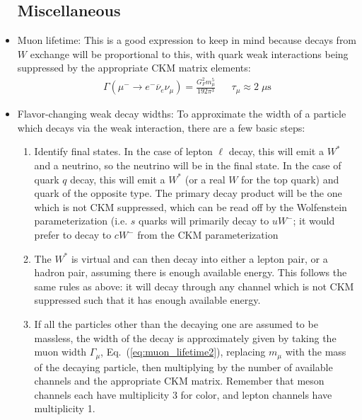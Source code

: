 \documentclass[11pt, oneside]{article}   	%
\theoremstyle{definition}
\numberwithin{equation}{subsection}		%
\begin{document}
\begin{itemize}
	\newpage
	\subsection{Miscellaneous}
	
	\item Muon lifetime: This is a good expression to keep in mind because decays from $W$ exchange will be proportional to this, 
	with quark weak interactions being suppressed by the appropriate CKM matrix elements:
	\begin{align}
		\Gamma(\mu^-\rightarrow e^- \overline\nu_e \nu_\mu) = \frac{G_F^2 m_\mu^5}{192\pi^3} && \tau_\mu\approx 2\;\mu\mathrm{s}
		\label{eq:muon_lifetime2}
	\end{align}
	
	\item Flavor-changing weak decay widths: To approximate the width of a particle which decays via the weak interaction, there are a few 
	basic steps:
	\begin{enumerate}
		\item Identify final states. In the case of lepton $\ell$ decay, this will emit a $W^*$ and a neutrino, so the neutrino will be 
		in the final state. In the case of quark $q$ decay, this will emit a $W^*$ (or a real $W$ for the top quark) and quark of the 
		opposite type. The primary decay product will be the one which is not CKM suppressed, which can be read off by the 
		Wolfenstein parameterization (i.e. $s$ quarks will primarily decay to $u W^-$; it would prefer to decay to $c W^-$ from the 
		CKM parameterization
		\item The $W^*$ is virtual and can then decay into either a lepton pair, or a hadron pair, assuming there is enough 
		available energy. This follows the same rules as above: it will decay through any channel which is not CKM suppressed 
		such that it has enough available energy.
		\item If all the particles other than the decaying one are assumed to be massless, the width of the decay is approximately 
		given by taking the muon width $\Gamma_\mu$, Eq.~(\ref{eq:muon_lifetime2}), replacing $m_\mu$ with the 
		mass of the decaying particle, then multiplying by the number of available channels and the appropriate CKM matrix. 
		Remember that meson channels each have multiplicity 3 for color, and lepton channels have multiplicity 1.
	\end{enumerate}
	

\end{itemize}
\end{document}
